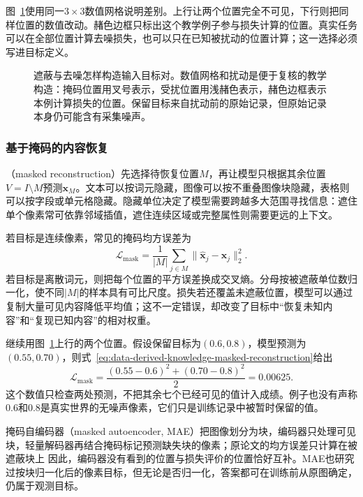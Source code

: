 图~\ref{fig:data-derived-knowledge-masking-denoising}使用同一$3\times3$数值网格说明差别。上行让两个位置完全不可见，下行则把同样位置的数值改动。赭色边框只标出这个教学例子参与损失计算的位置。真实任务可以在全部位置计算去噪损失，也可以只在已知被扰动的位置计算；这一选择必须写进目标定义。

\begin{figure}[htbp]
  \centering
  
  \caption{遮蔽与去噪怎样构造输入目标对。数值网格和扰动是便于复核的教学构造：掩码位置用叉号表示，受扰位置用浅赭色表示，赭色边框表示本例计算损失的位置。保留目标来自扰动前的原始记录，但原始记录本身仍可能含有采集噪声。}
  \label{fig:data-derived-knowledge-masking-denoising}
\end{figure}
\FloatBarrier

\subsubsection{基于掩码的内容恢复}
\label{sec:data-derived-knowledge-masked-recovery}

（masked reconstruction）先选择待恢复位置$M$，再让模型只根据其余位置$V=I\setminus M$预测$\bm{x}_M$。文本可以按词元隐藏，图像可以按不重叠图像块隐藏，表格则可以按字段或单元格隐藏。隐藏单位决定了模型需要跨越多大范围寻找信息：遮住单个像素常可依靠邻域插值，遮住连续区域或完整属性则需要更远的上下文。

若目标是连续像素，常见的掩码均方误差为
\begin{equation}
  \mathcal{L}_{\mathrm{mask}}
  =\frac{1}{|M|}\sum_{j\in M}\lVert \widehat{\bm{x}}_j-\bm{x}_j\rVert_2^2.
  \label{eq:data-derived-knowledge-masked-reconstruction}
\end{equation}
若目标是离散词元，则把每个位置的平方误差换成交叉熵。分母按被遮蔽单位数归一化，使不同$|M|$的样本具有可比尺度。损失若还覆盖未遮蔽位置，模型可以通过复制大量可见内容降低平均值；这不一定错误，却改变了目标中“恢复未知内容”和“复现已知内容”的相对权重。

继续用图~\ref{fig:data-derived-knowledge-masking-denoising}上行的两个位置。假设保留目标为$(0.6,0.8)$，模型预测为$(0.55,0.70)$，则式~\eqref{eq:data-derived-knowledge-masked-reconstruction}给出
\[
  \mathcal{L}_{\mathrm{mask}}
  =\frac{(0.55-0.6)^2+(0.70-0.8)^2}{2}
  =0.00625.
\]
这个数值只检查两处预测，不把其余七个已经可见的值计入成绩。例子也没有声称$0.6$和$0.8$是真实世界的无噪声像素，它们只是训练记录中被暂时保留的值。

掩码自编码器（masked autoencoder, MAE）把图像划分为块，编码器只处理可见块，轻量解码器再结合掩码标记预测缺失块的像素；原论文的均方误差只计算在被遮蔽块上
因此，编码器没有看到的位置与损失评价的位置恰好互补。MAE也研究过按块归一化后的像素目标，但无论是否归一化，答案都可在训练前从原图确定，仍属于观测目标。

